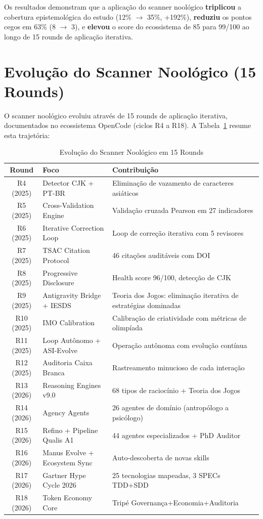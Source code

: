 Os resultados demonstram que a aplicação do scanner noológico \textbf{triplicou} a cobertura epistemológica do estudo (12\% $\rightarrow$ 35\%, +192\%), \textbf{reduziu} os pontos cegos em 63\% (8 $\rightarrow$ 3), e \textbf{elevou} o score do ecossistema de 85 para 99/100 ao longo de 15 rounds de aplicação iterativa.

\section{Evolução do Scanner Noológico (15 Rounds)}

O scanner noológico evoluiu através de 15 rounds de aplicação iterativa, documentados no ecossistema OpenCode (ciclos R4 a R18). A Tabela~\ref{tab:scanner-evolution} resume esta trajetória:

\begin{table}[H]
\centering
\caption{Evolução do Scanner Noológico em 15 Rounds}
\label{tab:scanner-evolution}
\begin{tabular}{clp{6cm}}
\toprule
\textbf{Round} & \textbf{Foco} & \textbf{Contribuição} \\
\midrule
R4 (2025) & Detector CJK + PT-BR & Eliminação de vazamento de caracteres asiáticos \\
R5 (2025) & Cross-Validation Engine & Validação cruzada Pearson em 27 indicadores \\
R6 (2025) & Iterative Correction Loop & Loop de correção iterativa com 5 revisores \\
R7 (2025) & TSAC Citation Protocol & 46 citações auditáveis com DOI \\
R8 (2025) & Progressive Disclosure & Health score 96/100, detecção de CJK \\
R9 (2025) & Antigravity Bridge + IESDS & Teoria dos Jogos: eliminação iterativa de estratégias dominadas \\
R10 (2025) & IMO Calibration & Calibração de criatividade com métricas de olimpíada \\
R11 (2025) & Loop Autônomo + ASI-Evolve & Operação autônoma com evolução contínua \\
R12 (2025) & Auditoria Caixa Branca & Rastreamento minucioso de cada interação \\
R13 (2026) & Reasoning Engines v9.0 & 68 tipos de raciocínio + Teoria dos Jogos \\
R14 (2026) & Agency Agents & 26 agentes de domínio (antropólogo a psicólogo) \\
R15 (2026) & Refino + Pipeline Qualis A1 & 44 agentes especializados + PhD Auditor \\
R16 (2026) & Manus Evolve + Ecosystem Sync & Auto-descoberta de novas skills \\
R17 (2026) & Gartner Hype Cycle 2026 & 25 tecnologias mapeadas, 3 SPECs TDD+SDD \\
R18 (2026) & Token Economy Core & Tripé Governança+Economia+Auditoria \\
\bottomrule
\end{tabular}
\end{table}

